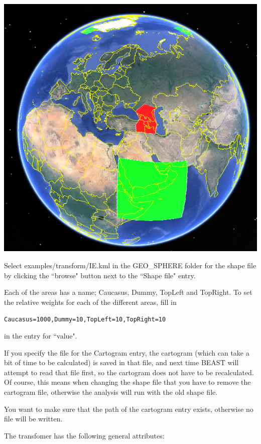 \documentclass{article}
\def\beast-geo{GEO\_SPHERE}
\begin{document}
\begin{center}
\includegraphics[scale=0.4]{figures/IEmap.png}
\end{center}

Select examples/transform/IE.kml in the \beast-geo{} folder for the shape file by clicking the ``browse" button next to the ``Shape file" entry.

Each of the areas has a name; Caucasus, Dummy, TopLeft and TopRight. To set the relative weights for each of the different areas, fill in

{\tt Caucasus=1000,Dummy=10,TopLeft=10,TopRight=10}

 in the entry for ``value". 

If you specify the file for the Cartogram entry, the cartogram (which can take a bit of time to be calculated) is saved in that file, and next time BEAST will attempt to read that file first, so the cartogram does not have to be recalculated. Of course, this means when changing the shape file that you have to remove the cartogram file, otherwise the analysis will run with the old shape file.

You want to make sure that the path of the cartogram entry exists, otherwise no file will be written. 

The transfomer has the following general attributes:\\
\end{document}

